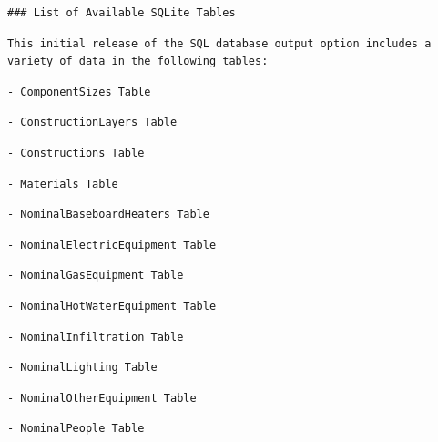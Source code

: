 \begin{lstlisting}
### List of Available SQLite Tables
\end{lstlisting}

\begin{lstlisting}
This initial release of the SQL database output option includes a variety of data in the following tables:
\end{lstlisting}

\begin{lstlisting}
- ComponentSizes Table
\end{lstlisting}

\begin{lstlisting}
- ConstructionLayers Table
\end{lstlisting}

\begin{lstlisting}
- Constructions Table
\end{lstlisting}

\begin{lstlisting}
- Materials Table
\end{lstlisting}

\begin{lstlisting}
- NominalBaseboardHeaters Table
\end{lstlisting}

\begin{lstlisting}
- NominalElectricEquipment Table
\end{lstlisting}

\begin{lstlisting}
- NominalGasEquipment Table
\end{lstlisting}

\begin{lstlisting}
- NominalHotWaterEquipment Table
\end{lstlisting}

\begin{lstlisting}
- NominalInfiltration Table
\end{lstlisting}

\begin{lstlisting}
- NominalLighting Table
\end{lstlisting}

\begin{lstlisting}
- NominalOtherEquipment Table
\end{lstlisting}

\begin{lstlisting}
- NominalPeople Table
\end{lstlisting}

